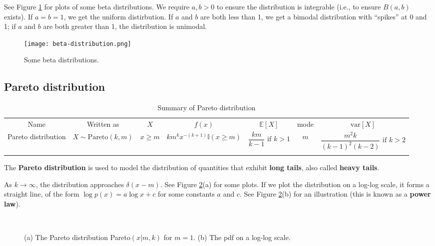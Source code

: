 See Figure \ref{fig:beta-distribution} for plots of some beta distributions. We require  $a, b >0$ to ensure the distribution is integrable (i.e., to ensure $B(a, b)$ exists). If $a=b=1$, we get the uniform distirbution. If $a$ and $b$ are both less than 1, we get a bimodal distribution with “spikes” at 0 and 1; if $a$ and $b$ are both greater than 1, the distribution is unimodal.

\begin{figure}[hbtp]
\centering
    \texttt{[image: beta-distribution.png]}
\caption{Some beta distributions.}
\label{fig:beta-distribution} 
\end{figure}


\subsection{Pareto distribution}

\begin{table*}
\caption{Summary of Pareto distribution}
\centering
\begin{tabular}{ccccccc}
\hline\noalign{\smallskip}
Name & Written as & $X$ & $f(x)$ & $\mathbb{E}[X]$ & mode & $\text{var}[X]$ \\
\noalign{\smallskip}\svhline\noalign{\smallskip}
Pareto distribution & $X \sim \text{Pareto}(k,m)$ & $x \geq m$ & $km^kx^{-(k+1)}\mathbb{I}(x \geq m)$ & $\dfrac{km}{k-1} \text{ if } k > 1$ & $m$ & $\dfrac{m^2k}{(k-1)^2(k-2)} \text{ if } k>2$ \\
\noalign{\smallskip}\hline
\end{tabular}
\end{table*} 

The \textbf{Pareto distribution} is used to model the distribution of quantities that exhibit \textbf{long tails}, also called \textbf{heavy tails}.

As $k \rightarrow \infty$, the distribution approaches $\delta(x-m)$. See Figure \ref{fig:Pareto-distribution}(a) for some plots. If we plot the distribution on a log-log scale, it forms a straight line, of the form $\log p(x)=a\log x+c$ for some constants $a$ and $c$. See Figure \ref{fig:Pareto-distribution}(b) for an illustration (this is known as a \textbf{power law}).

\begin{figure}[hbtp]
\centering
{} \\
\caption{(a) The Pareto distribution Pareto$(x|m, k)$ for $m=1$. (b) The pdf on a log-log scale.}
\label{fig:Pareto-distribution} 
\end{figure}

